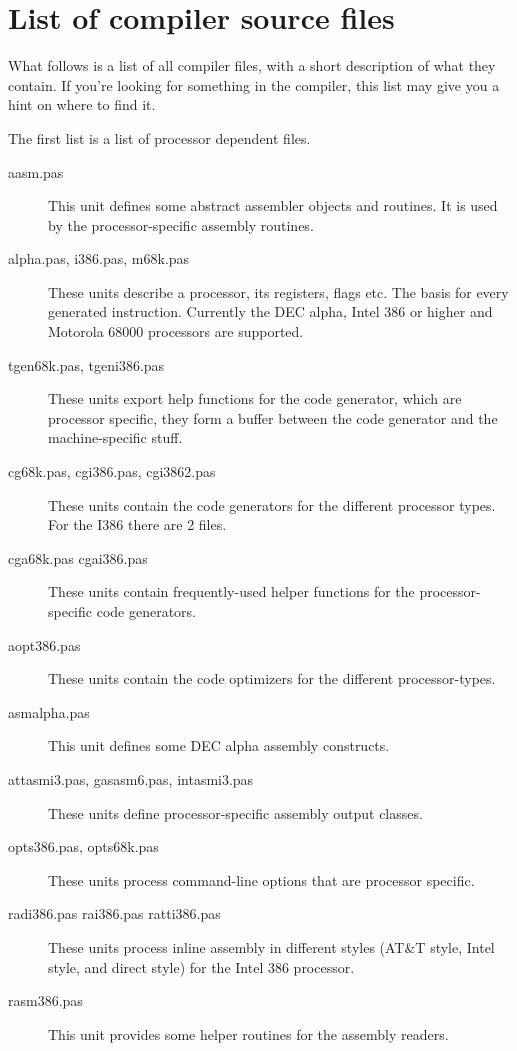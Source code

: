 \documentclass{report}
\begin{document}

\chapter{List of compiler source files}
\label{ch:AppB}
What follows is a list of all compiler files, with a short description 
of what they contain. If you're looking for something in the compiler, this
list may give you a hint on where to find it.

The first list is a list of processor dependent files.
\begin{description}
\item [aasm.pas] This unit defines some abstract assembler objects and
routines. It is used by the processor-specific assembly routines.
\item [alpha.pas, i386.pas, m68k.pas]
These units describe a processor, its registers, flags etc. 
The basis for every generated instruction. Currently the DEC alpha, Intel
386 or higher and Motorola 68000 processors are supported.
\item [tgen68k.pas, tgeni386.pas]
These units export help functions for the code generator, which are
processor specific, they form a buffer between the code generator and the
machine-specific stuff. 
\item [cg68k.pas, cgi386.pas, cgi3862.pas] These units contain the code
generators for the different processor types. For the I386 there are 2
files.
\item [cga68k.pas cgai386.pas]
These units contain frequently-used helper functions for the 
processor-specific code generators.
\item [aopt386.pas]
These units contain the code optimizers for the different processor-types.
\item [asmalpha.pas]
This unit defines some DEC alpha assembly constructs.
\item [attasmi3.pas, gasasm6.pas, intasmi3.pas]
These units define processor-specific assembly output classes.
\item [opts386.pas, opts68k.pas]
These units process command-line options that are processor specific.
\item [radi386.pas rai386.pas ratti386.pas]
These units process inline assembly in different styles (AT\&T style, Intel
style, and direct style) for the Intel 386 processor.
\item [rasm386.pas]
This unit provides some helper routines for the assembly readers.
\end{description}
\end{document}
